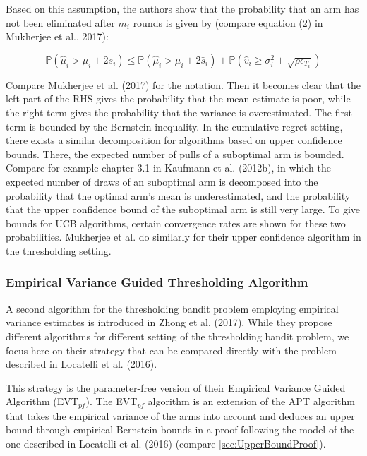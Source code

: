 \documentclass[11pt,]{article}
\begin{document}
Based on this assumption, the authors show that the probability that an
arm has not been eliminated after \(m_i\) rounds is given by (compare
equation (2) in Mukherjee et al., 2017):

\begin{equation} \label{Mukherjee2017Equation2}
\mathbb{P}(\hat{\mu}_i > \mu_i + 2s_i) \leq \mathbb{P} (\hat{\mu}_i > \mu_i + 2\bar{s}_i) + \mathbb{P}(\hat{v}_i \geq \sigma^2_i + \sqrt{\rho \epsilon_{T_i}})
\end{equation}

Compare Mukherjee et al. (2017) for the notation. Then it becomes clear
that the left part of the RHS gives the probability that the mean
estimate is poor, while the right term gives the probability that the
variance is overestimated. The first term is bounded by the Bernstein
inequality. In the cumulative regret setting, there exists a similar
decomposition for algorithms based on upper confidence bounds. There,
the expected number of pulls of a suboptimal arm is bounded. Compare for
example chapter 3.1 in Kaufmann et al. (2012b), in which the expected
number of draws of an suboptimal arm is decomposed into the probability
that the optimal arm's mean is underestimated, and the probability that
the upper confidence bound of the suboptimal arm is still very large. To
give bounds for UCB algorithms, certain convergence rates are shown for
these two probabilities. Mukherjee et al. do similarly for their upper
confidence algorithm in the thresholding setting.

\subsubsection{\texorpdfstring{Empirical Variance Guided Thresholding
Algorithm
\label{sec:EVTAlgorithm}}{Empirical Variance Guided Thresholding Algorithm }}\label{empirical-variance-guided-thresholding-algorithm}

A second algorithm for the thresholding bandit problem employing
empirical variance estimates is introduced in Zhong et al. (2017). While
they propose different algorithms for different setting of the
thresholding bandit problem, we focus here on their strategy that can be
compared directly with the problem described in Locatelli et al. (2016).

This strategy is the parameter-free version of their Empirical Variance
Guided Algorithm (EVT\(_{pf}\)). The EVT\(_{pf}\) algorithm is an
extension of the APT algorithm that takes the empirical variance of the
arms into account and deduces an upper bound through empirical Bernstein
bounds in a proof following the model of the one described in Locatelli
et al. (2016) (compare \autoref{sec:UpperBoundProof}).
\end{document}
